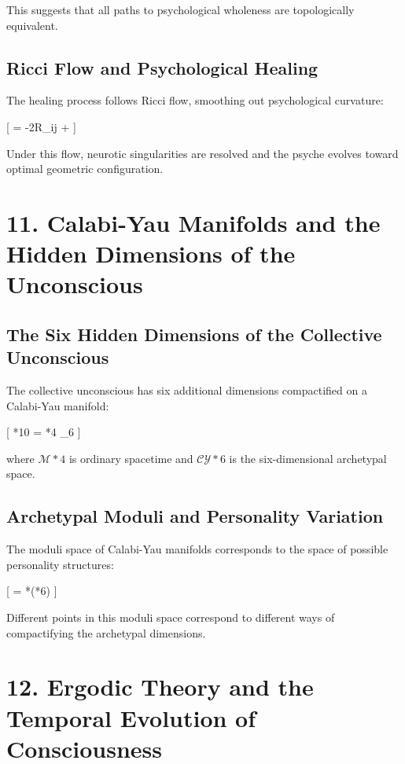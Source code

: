 \documentclass[12pt]{article}
\begin{document}
This suggests that all paths to psychological wholeness are topologically equivalent.

\subsection*{Ricci Flow and Psychological Healing}

The healing process follows Ricci flow, smoothing out psychological curvature:

[
 = -2R_{ij} + 
]

Under this flow, neurotic singularities are resolved and the psyche evolves toward optimal geometric configuration.

\section*{11. Calabi-Yau Manifolds and the Hidden Dimensions of the Unconscious}

\subsection*{The Six Hidden Dimensions of the Collective Unconscious}

The collective unconscious has six additional dimensions compactified on a Calabi-Yau manifold:

[
*{10} = *{4} \times {}_{6}
]

where $\mathcal{M}*{4}$ is ordinary spacetime and $\mathcal{CY}*{6}$ is the six-dimensional archetypal space.

\subsection*{Archetypal Moduli and Personality Variation}

The moduli space of Calabi-Yau manifolds corresponds to the space of possible personality structures:

[
 = *{}(*{6})
]

Different points in this moduli space correspond to different ways of compactifying the archetypal dimensions.

\section*{12. Ergodic Theory and the Temporal Evolution of Consciousness}
\end{document}
